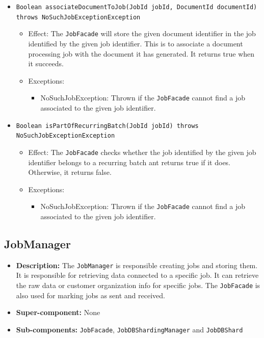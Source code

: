 \documentclass[a4paper,10pt]{article}
\begin{document}
\begin{itemize}
\begin{itemize}
 	
    	\item \texttt{Boolean associateDocumentToJob(JobId jobId, DocumentId documentId) throws NoSuchJobExceptionException}
    	\begin{itemize}
    		\item Effect: The \texttt{JobFacade} will store the given document identifier in the job identified by the given job identifier. This is to associate a document processing job with the document it has generated. It returns true when it succeeds.
    		\item Exceptions:
    		\begin{itemize}
    			\item NoSuchJobException: Thrown if the \texttt{JobFacade} cannot find a job associated to the given job identifier.
    		\end{itemize}
    	\end{itemize} 	

    	\item \texttt{Boolean isPartOfRecurringBatch(JobId jobId) throws NoSuchJobExceptionException}
    	\begin{itemize}
    		\item Effect: The \texttt{JobFacade} checks whether the job identified by the given job identifier belongs to a recurring batch ant returns true if it does. Otherwise, it returns false.
    		\item Exceptions:
    		\begin{itemize}
    			\item NoSuchJobException: Thrown if the \texttt{JobFacade} cannot find a job associated to the given job identifier.
    		\end{itemize}
    	\end{itemize}  	
    	
    \end{itemize}
\end{itemize}

\subsection{JobManager}
\begin{itemize}
    \item \textbf{Description:} The \texttt{JobManager} is responsible creating jobs and storing them. It is responsible for retrieving data connected to a specific job. It can retrieve the raw data or customer organization info for specific jobs. The \texttt{JobFacade} is also used for marking jobs as sent and received.
    \item \textbf{Super-component:} None
    \item \textbf{Sub-components:} \texttt{JobFacade}, \texttt{JobDBShardingManager} and \texttt{JobDBShard}
\end{itemize}
\end{document}
